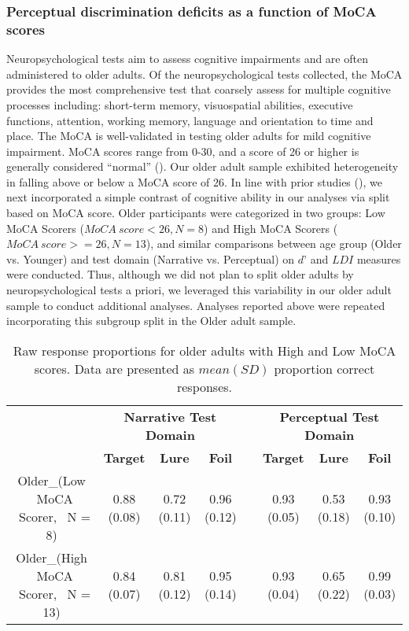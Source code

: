 \documentclass[11pt]{article}
\begin{document}
\subsubsection*{Perceptual discrimination deficits as a function of MoCA scores}
Neuropsychological tests aim to assess cognitive impairments and are often administered to older adults. Of the neuropsychological tests collected, the MoCA provides the most comprehensive test that coarsely assess for multiple cognitive processes including: short-term memory, visuospatial abilities, executive functions, attention, working memory, language and orientation to time and place. The MoCA is well-validated in testing older adults for mild cognitive impairment. MoCA scores range from 0-30, and a score of 26 or higher is generally considered “normal” (\cite{nasreddine_montreal_2005}). Our older adult sample exhibited heterogeneity in falling above or below a MoCA score of 26. In line with prior studies (\cite{pishdadian_not_2020}), we next incorporated a simple contrast of cognitive ability in our analyses via split based on MoCA score. Older participants were categorized in two groups: Low MoCA Scorers ($MoCA \ score < 26, N = 8$) and High MoCA Scorers ($MoCA \ score >= 26, N =13$), and similar comparisons between age group (Older vs. Younger) and test domain (Narrative vs. Perceptual) on $d’$ and $LDI$ measures were conducted. Thus, although we did not plan to split older adults by neuropsychological tests a priori, we leveraged this variability in our older adult sample to conduct additional analyses. Analyses reported above were repeated incorporating this subgroup split in the Older adult sample.

\begin{table}[]
\begin{tabular}{cccccccc}
                                & \multicolumn{3}{c}{\textbf{Narrative Test Domain}} & \textbf{} & \multicolumn{3}{c}{\textbf{Perceptual Test Domain}} \\ \cline{2-4} \cline{6-8} 
 & \textbf{Target} & \textbf{Lure} & \textbf{Foil} & \textbf{} & \textbf{Target} & \textbf{Lure} & \textbf{Foil} \\ \cline{2-4} \cline{6-8} 
Older_{(Low \ MoCA \ Scorer, \ N = 8)}    & 0.88 (0.08)     & 0.72 (0.11)     & 0.96 (0.12)    &           & 0.93 (0.05)     & 0.53 (0.18)     & 0.93 (0.10)     \\
Older_{(High \ MoCA \ Scorer, \ N = 13)} & 0.84 (0.07)     & 0.81 (0.12)     & 0.95 (0.14)    &           & 0.93 (0.04)     & 0.65 (0.22)     & 0.99 (0.03)    
\end{tabular}
\caption{Raw response proportions for older adults with High and Low MoCA scores. Data are presented as $mean (SD)$ proportion correct responses.}
\label{table3}
\end{table}
\end{document}

